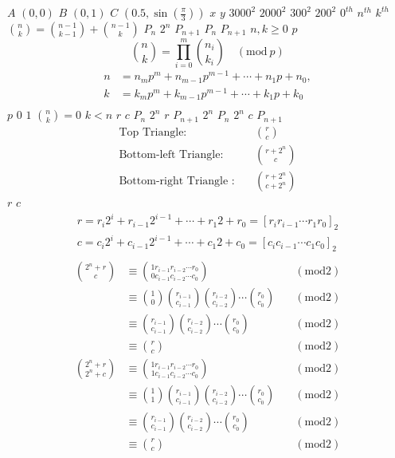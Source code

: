 \documentclass{article}
\begin{document}
$A$
$\left(0, 0\right)$
$B$
$\left(0, 1\right)$
$C$
$\left(0.5, \sin\left(\frac{\pi}{3}\right)\right)$
$x$
$y$
$3000^{2}$
$2000^{2}$
$300^{2}$
$200^{2}$
$0^{th}$
$n^{th}$
$k^{th}$
$\binom{n}{k} = \binom{n-1}{k-1} + \binom{n-1}{k}$
$P_{n}$
$2^{n}$
$P_{n+1}$
$P_{n}$
$P_{n+1}$
$n,k \ge 0$
$p$
\begin{equation}
\binom{n}{k} = \prod_{i=0}^{m} \binom{n_i}{k_i} \quad (\text{mod}~p)
\end{equation}
\begin{align*}
n &= n_{m}p^{m}+n_{m-1}p^{m-1}+\cdots + n_{1}p+n_{0},\\
k &= k_{m}p^{m}+k_{m-1}p^{m-1}+\cdots + k_{1}p+k_{0}\\
\end{align*}
$p$
$0$
$1$
$\binom{n}{k} = 0$
$k < n$
$r$
$c$
$P_{n}$
$2^{n}$
$r$
$P_{n+1}$
$2^{n}$
$P_{n}$
$2^{n}$
$c$
$P_{n+1}$
\begin{align*}
\text{Top Triangle:} \quad &\binom{r}{c}  \\
\text{Bottom-left Triangle:}\quad &\binom{r + 2^n}{c}  \\
\text{Bottom-right Triangle :}\quad &\binom{r + 2^n}{c + 2^n} \label{eq:bottom-right}
\end{align*}
$r$
$c$
\begin{align*}
r=r_{i}2^{i}+r_{i-1}2^{i-1}+\cdots + r_{1}2+r_{0}= \left[r_{i}r_{i-1}\cdots r_{1}r_{0}\right]_2\\
c=c_{i}2^{i}+c_{i-1}2^{i-1}+\cdots +c_{1}2+c_{0}=\left[c_{i}c_{i-1}\cdots c_{1}c_{0}\right]_2\\
\end{align*}
\begin{align*}
\binom{2^n + r}{c} &\equiv \binom{1r_{i-1}r_{i-2} \cdots r_{0}}{0c_{i-1}c_{i-2} \cdots c_{0}} \quad &(\text{mod} 2)\\
&\equiv \binom{1}{0}\binom{r_{i-1}}{c_{i-1}}\binom{r_{i-2}}{c_{i-2}} \cdots \binom{r_0}{c_0} \quad &(\text{mod} 2)\\
&\equiv\binom{r_{i-1}}{c_{i-1}}\binom{r_{i-2}}{c_{i-2}} \cdots \binom{r_0}{c_0} \quad &(\text{mod} 2)\\
&\equiv \binom{r}{c} \quad &(\text{mod} 2)
\end{align*}
\begin{align*}
\binom{2^n + r}{2^n + c} &\equiv \binom{1r_{i-1}r_{i-2} \cdots r_{0}}{1c_{i-1}c_{i-2} \cdots c_{0}} \quad &(\text{mod} 2)\\
&\equiv \binom{1}{1}\binom{r_{i-1}}{c_{i-1}}\binom{r_{i-2}}{c_{i-2}} \cdots \binom{r_0}{c_0} \quad &(\text{mod} 2)\\
&\equiv \binom{r_{i-1}}{c_{i-1}}\binom{r_{i-2}}{c_{i-2}} \cdots \binom{r_0}{c_0} \quad &(\text{mod} 2)\\
&\equiv \binom{r}{c} \quad &(\text{mod} 2)
\end{align*}
\end{document}
